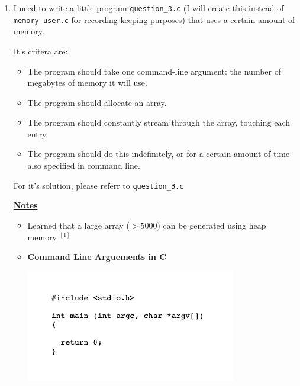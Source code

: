 \documentclass[12pt]{article}
\begin{document}
\begin{enumerate}[1.]
    \item

    I need to write a little program \texttt{question\_3.c} (I will create this instead of
    \texttt{memory-user.c} for recording keeping purposes) that uses a certain amount of memory.

    \bigskip

    It's critera are:

    \begin{itemize}
        \item The program should take one command-line argument: the number of megabytes of memory it will use.
        \item The program should allocate an array.
        \item The program should constantly stream through the array, touching each entry.
        \item The program should do this indefinitely, or for a certain amount of time also specified in command line.
    \end{itemize}

    \bigskip

    For it's solution, please referr to \texttt{question\_3.c}

    \bigskip

    \underline{\textbf{Notes}}

    \begin{itemize}
        \item Learned that a large array ($> 5000$) can be generated using heap
        memory $^{[1]}$


        \item \textbf{Command Line Arguements in C}

        \begin{center}
        \includegraphics[width=0.7\linewidth]{images/worksheet_6_solution_2.png}
        \end{center}


\end{itemize}
\end{enumerate}
\end{document}
